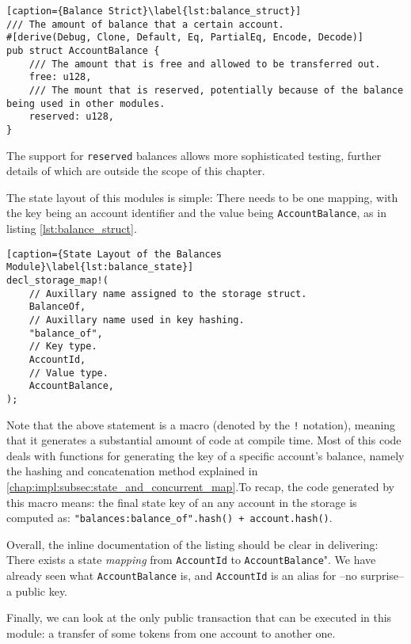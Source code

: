 \begin{lstlisting}[caption={Balance Strict}\label{lst:balance_struct}]
/// The amount of balance that a certain account.
#[derive(Debug, Clone, Default, Eq, PartialEq, Encode, Decode)]
pub struct AccountBalance {
	/// The amount that is free and allowed to be transferred out.
	free: u128,
	/// The mount that is reserved, potentially because of the balance being used in other modules.
	reserved: u128,
}
\end{lstlisting}

\begin{remark}
	The support for \texttt{reserved} balances allows more sophisticated testing, further details of
	which are outside the scope of this chapter.
\end{remark}

The state layout of this modules is simple: There needs to be one mapping, with the key being an
account identifier and the value being \texttt{AccountBalance}, as in listing
\ref{lst:balance_struct}.

\begin{lstlisting}[caption={State Layout of the Balances Module}\label{lst:balance_state}]
decl_storage_map!(
	// Auxillary name assigned to the storage struct.
	BalanceOf,
	// Auxillary name used in key hashing.
	"balance_of",
	// Key type.
	AccountId,
	// Value type.
	AccountBalance,
);
\end{lstlisting}

Note that the above statement is a macro (denoted by the \texttt{!} notation), meaning that it
generates a substantial amount of code at compile time. Most of this code deals with functions for
generating the key of a specific account's balance, namely the hashing and concatenation method
explained in \ref{chap:impl:subsec:state_and_concurrent_map}.To recap, the code generated by this
macro means: the final state key of an any account in the storage is computed as:
\texttt{"balances:balance\_of".hash() + account.hash()}.

Overall, the inline documentation of the listing should be clear in delivering: There exists a state
\textit{mapping} from \texttt{AccountId} to \texttt{AccountBalance}". We have already seen what
\texttt{AccountBalance} is, and \texttt{AccountId} is an alias for --no surprise-- a public key.

Finally, we can look at the only public transaction that can be executed in this module: a transfer
of some tokens from one account to another one.

